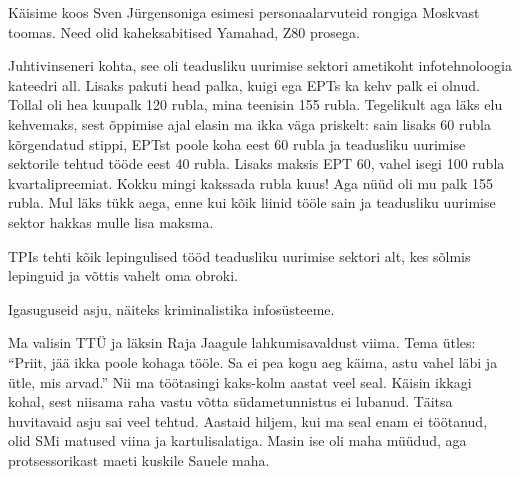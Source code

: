 Käisime koos Sven 
Jürgensoniga esimesi personaalarvuteid rongiga Moskvast toomas. Need olid kaheksabitised Yamahad, 
Z80 prosega.


Juhtivinseneri kohta, see oli 
teadusliku uurimise sektori ametikoht infotehnoloogia kateedri 
all. Lisaks pakuti head 
palka, kuigi ega EPTs ka kehv palk ei olnud. Tollal oli hea kuupalk 
120 rubla, mina teenisin 155 rubla. Tegelikult aga läks elu 
kehvemaks, sest õppimise ajal elasin ma ikka väga priskelt: sain lisaks
60 rubla kõrgendatud stippi, EPTst poole koha eest 60 rubla ja teadusliku uurimise sektorile tehtud tööde eest 40 rubla. Lisaks maksis EPT 
60, vahel isegi 100 rubla kvartalipreemiat. Kokku mingi kakssada rubla kuus! Aga nüüd oli mu palk 155 
rubla. Mul läks tükk aega, enne kui kõik liinid tööle sain ja teadusliku uurimise 
sektor hakkas mulle lisa maksma. 


TPIs tehti kõik lepingulised tööd teadusliku uurimise 
sektori alt, kes sõlmis lepinguid ja võttis vahelt oma obroki. 


Igasuguseid asju, näiteks kriminalistika infosüsteeme. 

Ma valisin TTÜ ja läksin Raja Jaagule 
lahkumisavaldust viima. Tema ütles: \enquote{Priit, jää ikka
poole kohaga tööle. Sa ei pea kogu aeg käima, astu vahel läbi ja 
ütle, mis arvad.} Nii ma töötasingi kaks-kolm 
aastat veel seal. Käisin ikkagi kohal, sest niisama raha vastu võtta
südametunnistus ei lubanud. 
Täitsa huvitavaid asju sai veel tehtud. Aastaid hiljem, kui ma seal enam ei töötanud, olid SMi 
matused viina ja kartulisalatiga. Masin ise oli maha müüdud, aga 
protsessorikast maeti kuskile Sauele maha. 


